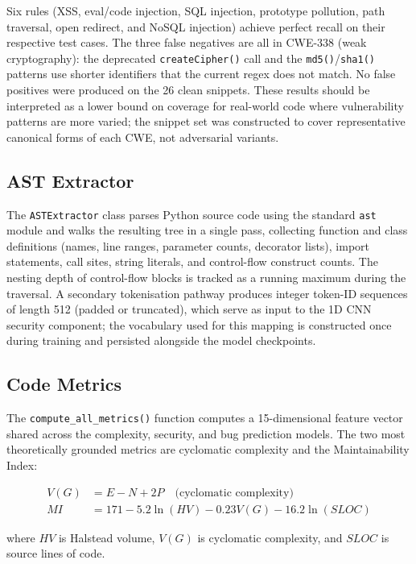 \documentclass[12pt, oneside]{report}
\begin{document}
Six rules (XSS, eval/code injection, SQL injection, prototype pollution, path
traversal, open redirect, and NoSQL injection) achieve perfect recall on their
respective test cases. The three false negatives are all in CWE-338 (weak
cryptography): the deprecated \texttt{createCipher()} call and the \texttt{md5()}/\texttt{sha1()} patterns
use shorter identifiers that the current regex does not match. No false positives
were produced on the 26 clean snippets. These results should be interpreted as
a lower bound on coverage for real-world code where vulnerability patterns are
more varied; the snippet set was constructed to cover representative canonical forms
of each CWE, not adversarial variants.

\subsection{AST Extractor}

The \texttt{ASTExtractor} class parses Python source code using the standard
\texttt{ast} module and walks the resulting tree in a single pass, collecting function
and class definitions (names, line ranges, parameter counts, decorator lists), import
statements, call sites, string literals, and control-flow construct counts. The nesting
depth of control-flow blocks is tracked as a running maximum during the traversal.
A secondary tokenisation pathway produces integer token-ID sequences of length 512
(padded or truncated), which serve as input to the 1D CNN security component; the
vocabulary used for this mapping is constructed once during training and persisted
alongside the model checkpoints.

\subsection{Code Metrics}

The \texttt{compute\_all\_metrics()} function computes a 15-dimensional feature vector
shared across the complexity, security, and bug prediction models. The two most
theoretically grounded metrics are cyclomatic complexity and the Maintainability Index:

\begin{align}
  V(G) &= E - N + 2P \quad \text{(cyclomatic complexity)} \label{eq:cc}\\
  MI &= 171 - 5.2 \ln(HV) - 0.23 V(G) - 16.2 \ln(SLOC) \label{eq:mi}
\end{align}

where $HV$ is Halstead volume, $V(G)$ is cyclomatic complexity, and $SLOC$ is source
lines of code.
\end{document}

